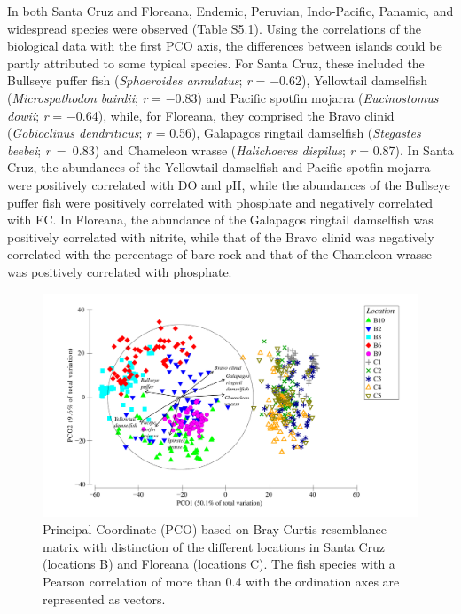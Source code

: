 \documentclass[jmse,article,accept,moreauthors,pdftex]{Definitions/mdpi}
\begin{document}
In both Santa Cruz and Floreana, Endemic, Peruvian, Indo-Pacific, Panamic, and widespread species were observed (Table S5.1). Using the correlations of the biological data with the first PCO axis, the differences between islands could be partly attributed to some typical species. For Santa Cruz, these included the Bullseye puffer fish (\textit{Sphoeroides annulatus}; \textit{r} = $-$0.62), Yellowtail damselfish (\textit{Microspathodon bairdii}; \textit{r} = $-$0.83) and Pacific spotfin mojarra (\textit{Eucinostomus dowii}; \textit{r} = $-$0.64), while, for Floreana, they comprised the Bravo clinid (\textit{Gobioclinus dendriticus}; \textit{r} = 0.56), Galapagos ringtail damselfish (\textit{Stegastes beebei}; \mbox{\textit{r} = 0.83}) and Chameleon wrasse (\textit{Halichoeres dispilus}; \textit{r} = 0.87). In Santa Cruz, the abundances of the Yellowtail damselfish and Pacific spotfin mojarra were positively correlated with DO and pH, while the abundances of the Bullseye puffer fish were positively correlated with phosphate and negatively correlated with EC. In Floreana, the abundance of the Galapagos ringtail damselfish was positively correlated with nitrite, while that of the Bravo clinid was negatively correlated with the percentage of bare rock and that of the Chameleon wrasse was positively correlated with phosphate. 

\begin{figure}[H]
 \hspace{-6mm}
  \includegraphics[scale=0.42]{PCO_with_species}
  \caption{{Principal Coordinate (PCO) based on} %
 Bray-Curtis resemblance matrix with distinction of the different locations in Santa Cruz (locations B) and Floreana (locations C). The fish species with a Pearson correlation of more than 0.4 with the ordination axes are represented as vectors.} 
  \label{fig:PCO_Location_full}
\end{figure}
\end{document}

